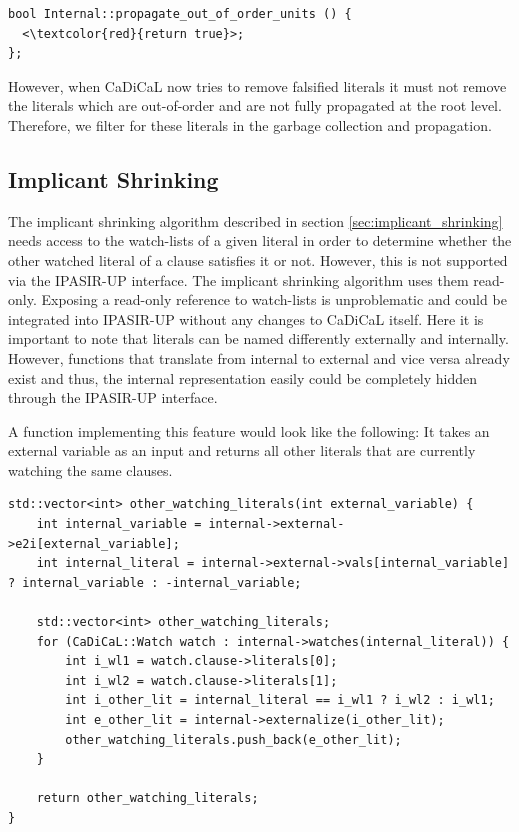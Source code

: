 \documentclass[12pt,a4paper]{article}
\begin{document}
\begin{verbatim}
bool Internal::propagate_out_of_order_units () {
  <\textcolor{red}{return true}>;
};
\end{verbatim}

However, when CaDiCaL now tries to remove falsified literals it must not remove the literals which are out-of-order and are not fully propagated at the root level. Therefore, we filter for these literals in the garbage collection and propagation.

\subsection{Implicant Shrinking}
The implicant shrinking algorithm described in section \ref{sec:implicant_shrinking} needs access to the watch-lists of a given literal in order to determine whether the other watched literal of a clause satisfies it or not. However, this is not supported via the IPASIR-UP interface. The implicant shrinking algorithm uses them read-only. Exposing a read-only reference to watch-lists is unproblematic and could be integrated into IPASIR-UP without any changes to CaDiCaL itself. Here it is important to note that literals can be named differently externally and internally. However, functions that translate from internal to external and vice versa already exist and thus, the internal representation easily could be completely hidden through the IPASIR-UP interface.

A function implementing this feature would look like the following: It takes an external variable as an input and returns all other literals that are currently watching the same clauses.

\newpage

\begin{verbatim}
std::vector<int> other_watching_literals(int external_variable) {
    int internal_variable = internal->external->e2i[external_variable];
    int internal_literal = internal->external->vals[internal_variable] ? internal_variable : -internal_variable;

    std::vector<int> other_watching_literals;
    for (CaDiCaL::Watch watch : internal->watches(internal_literal)) {
        int i_wl1 = watch.clause->literals[0];
        int i_wl2 = watch.clause->literals[1];
        int i_other_lit = internal_literal == i_wl1 ? i_wl2 : i_wl1;
        int e_other_lit = internal->externalize(i_other_lit);
        other_watching_literals.push_back(e_other_lit);
    }

    return other_watching_literals;
}
\end{verbatim}
\end{document}
